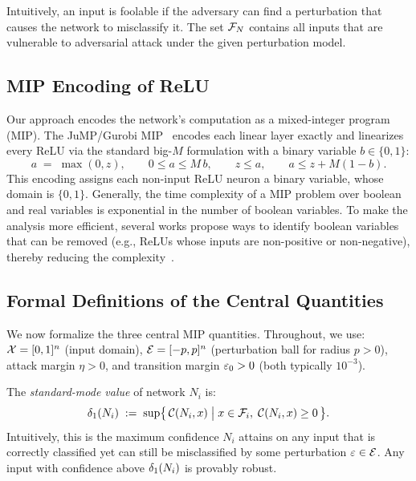 Intuitively, an input is foolable if the adversary can find a perturbation that causes the network to misclassify it. The set $\mathcal{F}_{N}$ contains all inputs that are vulnerable to adversarial attack under the given perturbation model.

\subsection{MIP Encoding of ReLU}

Our approach encodes the network's computation as a mixed-integer program (MIP). The JuMP/Gurobi MIP~\cite{jump,gurobi} encodes each linear layer exactly and linearizes every ReLU via the standard big-$M$ formulation with a binary variable $b \in \{0,1\}$:
\[
  a \;=\; \max(0,z), \qquad
  0 \le a \le M\,b, \qquad
  z \le a, \qquad
  a \le z + M(1-b).
\]
This encoding assigns each non-input ReLU neuron a binary variable, whose domain is $\{0,1\}$. Generally, the time complexity of a MIP problem over boolean and real variables is exponential in the number of boolean variables. To make the analysis more efficient, several works propose ways to identify boolean variables that can be removed (e.g., ReLUs whose inputs are non-positive or non-negative), thereby reducing the complexity~\cite{tjeng2019}.

\subsection{Formal Definitions of the Central Quantities}
\label{sec:notation:formal}

We now formalize the three central MIP quantities. Throughout, we use:
$\mathcal{X} = [0,1]^n$ (input domain),
$\mathcal{E} = [-p,p]^n$ (perturbation ball for radius $p > 0$),
attack margin $\eta > 0$, and transition margin $\varepsilon_0 > 0$ (both typically $10^{-3}$).

\begin{definition}
  \label{def:delta1}
  The \emph{standard-mode value} of network $N_i$ is:
  \[
    \delta_1(N_{i}) \;:=\;
    \sup\bigl\{\,\mathcal{C}(N_i,x)
      \;\big|\;
      x\in\mathcal{F}_{i},\;
      \mathcal{C}(N_i,x)\geq 0
    \,\bigr\}.
  \]
  Intuitively, this is the maximum confidence $N_i$ attains on any input that is correctly classified yet can still be misclassified by some perturbation $\varepsilon\in\mathcal{E}$. Any input with confidence above $\delta_1(N_{i})$ is provably robust.
\end{definition}

